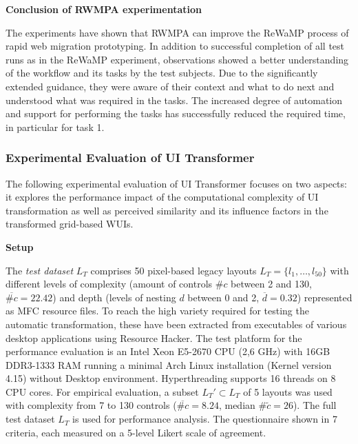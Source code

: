 \textbf{Conclusion of RWMPA experimentation}

The experiments have shown that RWMPA can improve the ReWaMP process of rapid web migration prototyping.
In addition to successful completion of all test runs as in the ReWaMP experiment, observations showed a better understanding of the workflow and its tasks by the test subjects.
Due to the significantly extended guidance, they were aware of their context and what to do next and understood what was required in the tasks.
The increased degree of automation and support for performing the tasks has successfully reduced the required time, in particular for task 1.

\hypertarget{experimental-evaluation-of-ui-transformer}{%
\subsubsection{Experimental Evaluation of UI Transformer}\label{experimental-evaluation-of-ui-transformer}}

The following experimental evaluation of UI Transformer focuses on two aspects: it explores the performance impact of the computational complexity of UI transformation as well as perceived similarity and its influence factors in the transformed grid-based WUIs.

\textbf{Setup}

The \emph{test dataset} \(L_T\) comprises 50 pixel-based legacy layouts \(L_T = \{l_1, \ldots, l_{50}\}\) with different levels of complexity (amount of controls \(\#c\) between 2 and 130, \(\overline{\#c} = 22.42\)) and depth (levels of nesting \(d\) between 0 and 2, \(\overline d = 0.32\)) represented as MFC resource files.
To reach the high variety required for testing the automatic transformation, these have been extracted from executables of various desktop applications using Resource Hacker.
The test platform for the performance evaluation is an Intel Xeon E5-2670 CPU (2,6 GHz) with 16GB DDR3-1333 RAM running a minimal Arch Linux installation (Kernel version 4.15) without Desktop environment.
Hyperthreading supports 16 threads on 8 CPU cores.
For empirical evaluation, a subset \(L_T' \subset L_T\) of 5 layouts was used with complexity from 7 to 130 controls (\(\overline{\#c} = 8.24\), median \(\#\tilde c = 26\)).
The full test dataset \(L_T\) is used for performance analysis.
The questionnaire shown in 7 criteria, each measured on a 5-level Likert scale of agreement.

